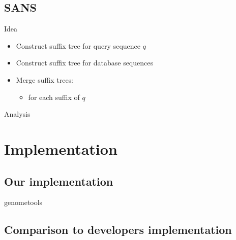 \documentclass[aspectratio=1610]{beamer}
\begin{document}
\subsection{SANS}
\begin{frame}{Idea}
  \begin{itemize}
    \item Construct suffix tree for query sequence $q$
    \item Construct suffix tree for database sequences
    \item Merge suffix trees:
      \begin{itemize}
        \item for each suffix of $q$
      \end{itemize}
  \end{itemize}
\end{frame}

\begin{frame}{Analysis}
\end{frame}

\section{Implementation}

\subsection{Our implementation}

\begin{frame}{genometools}
\end{frame}

\subsection{Comparison to developers implementation}

\begin{frame}{}
\end{frame}
\end{document}
